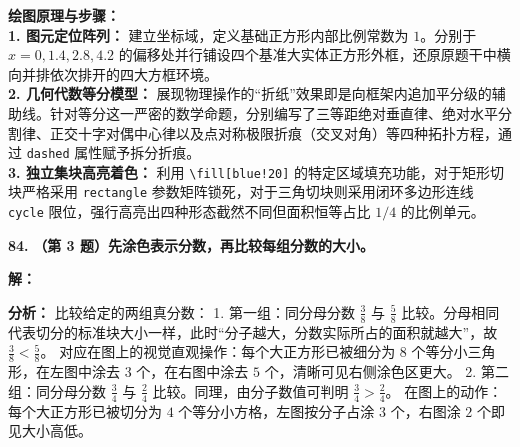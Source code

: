 \vspace{0.4cm}
{\small\color{blue!70!black}
\textbf{绘图原理与步骤：}\\
\textbf{1. 图元定位阵列：} 建立坐标域，定义基础正方形内部比例常数为 $1$。分别于 $x=0, 1.4, 2.8, 4.2$ 的偏移处并行铺设四个基准大实体正方形外框，还原原题干中横向并排依次排开的四大方框环境。\\
\textbf{2. 几何代数等分模型：} 展现物理操作的“折纸”效果即是向框架内追加平分级的辅助线。针对等分这一严密的数学命题，分别编写了三等距绝对垂直律、绝对水平分割律、正交十字对偶中心律以及点对称极限折痕（交叉对角）等四种拓扑方程，通过 \texttt{dashed} 属性赋予拆分折痕。\\
\textbf{3. 独立集块高亮着色：} 利用 \texttt{\textbackslash fill[blue!20]} 的特定区域填充功能，对于矩形切块严格采用 \texttt{rectangle} 参数矩阵锁死，对于三角切块则采用闭环多边形连线 \texttt{cycle} 限位，强行高亮出四种形态截然不同但面积恒等占比 $1/4$ 的比例单元。
}


\vspace{1.5cm}

\textbf{\LARGE 84.} \textbf{（第 3 题）先涂色表示分数，再比较每组分数的大小。}

\vspace{0.4cm}
\textbf{解：}

\textbf{分析：}
比较给定的两组真分数：
1. 第一组：同分母分数 $\displaystyle\frac{3}{8}$ 与 $\displaystyle\frac{5}{8}$ 比较。分母相同代表切分的标准块大小一样，此时“分子越大，分数实际所占的面积就越大”，故 $\displaystyle\frac{3}{8} < \displaystyle\frac{5}{8}$。
对应在图上的视觉直观操作：每个大正方形已被细分为 $8$ 个等分小三角形，在左图中涂去 $3$ 个，在右图中涂去 $5$ 个，清晰可见右侧涂色区更大。
2. 第二组：同分母分数 $\displaystyle\frac{3}{4}$ 与 $\displaystyle\frac{2}{4}$ 比较。同理，由分子数值可判明 $\displaystyle\frac{3}{4} > \displaystyle\frac{2}{4}$。
在图上的动作：每个大正方形已被切分为 $4$ 个等分小方格，左图按分子占涂 $3$ 个，右图涂 $2$ 个即见大小高低。

